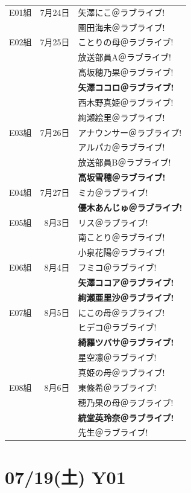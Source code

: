 \def\iD{\mincho}
\def\iA{\minchob}
\def\iB{\mincho\bfseries}
{\mincho{}
\begin{longtable}{|rrl|}\hline
E01組 & 7月24日 & \iA 矢澤にこ＠ラブライブ!\\
 & & \iA 園田海未＠ラブライブ!\\\hline
E02組 & 7月25日 & \iD ことりの母＠ラブライブ!\\
 & & \iD 放送部員A＠ラブライブ!\\
 & & \iA 高坂穂乃果＠ラブライブ!\\
 & & \iB 矢澤ココロ＠ラブライブ!\\
 & & \iA 西木野真姫＠ラブライブ!\\
 & & \iA 絢瀬絵里＠ラブライブ!\\\hline
E03組 & 7月26日 & \iD アナウンサー＠ラブライブ!\\
 & & \iD アルパカ＠ラブライブ!\\
 & & \iD 放送部員B＠ラブライブ!\\
 & & \iB 高坂雪穂＠ラブライブ!\\\hline
E04組 & 7月27日 & \iD ミカ＠ラブライブ!\\
 & & \iB 優木あんじゅ＠ラブライブ!\\\hline
E05組 & 8月3日 & \iD リス＠ラブライブ!\\
 & & \iA 南ことり＠ラブライブ!\\
 & & \iA 小泉花陽＠ラブライブ!\\\hline
E06組 & 8月4日 & \iD フミコ＠ラブライブ!\\
 & & \iB 矢澤ココア＠ラブライブ!\\
 & & \iB 絢瀬亜里沙＠ラブライブ!\\\hline
E07組 & 8月5日 & \iD にこの母＠ラブライブ!\\
 & & \iD ヒデコ＠ラブライブ!\\
 & & \iB 綺羅ツバサ＠ラブライブ!\\
 & & \iA 星空凛＠ラブライブ!\\
 & & \iD 真姫の母＠ラブライブ!\\\hline
E08組 & 8月6日 & \iA 東條希＠ラブライブ!\\
 & & \iD 穂乃果の母＠ラブライブ!\\
 & & \iB 統堂英玲奈＠ラブライブ!\\
 & & \iD 先生＠ラブライブ!\\\hline
\end{longtable}}

\section{07/19(土) Y01}

